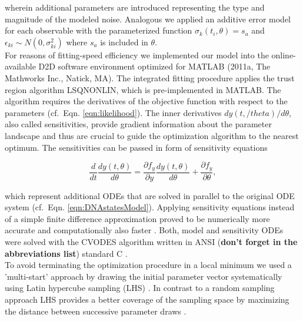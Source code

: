 wherein additional parameters are introduced representing the type and magnitude of the modeled noise. Analogous we applied an additive error model for each observable with the parameterized function $\sigma_{k}(t_i,\theta) = s_a$ and $\epsilon_{ki} \sim N(0,\sigma_{ki}^2)$ where $s_a$ is included in $\theta$.\\ 
For reasons of fitting-speed efficiency we implemented our model into the online-available D2D software environment \cite{Raue2013} optimized for MATLAB (2011a, The Mathworks Inc., Natick, MA). The integrated fitting procedure applies the trust region algorithm LSQNONLIN, which is pre-implemented in MATLAB. The algorithm requires the derivatives of the objective function with respect to the parameters (cf.\ Eqn. \ref{eqn:likelihood}). The inner derivatives $dy(t,/theta)/d\theta$, also called sensitivities, provide gradient information about the parameter landscape and thus are crucial to guide the optimization algorithm to the nearest optimum. The sensitivities can be passed in form of sensitivity equations 

\begin{equation}
	\frac{d}{dt}\frac{dy(t,\theta)}{d\theta} = \frac{\partial f_y}{\partial y}\frac{dy(t,\theta)}{d\theta}+\frac{\partial f_y}{\partial \theta},
\end{equation}  

which represent additional ODEs that are solved in parallel to the original ODE system (cf.\ Eqn. \ref{eqn:DNAstatesModel})\cite{Leis1988}. Applying sensitivity equations instead of a simple finite difference approximation proved to be numerically more accurate and computationally also faster \cite{Raue2013}. Both, model and sensitivity ODEs were solved with the CVODES algorithm written in ANSI (\textbf{don't forget in the abbreviations list}) standard C \cite{Hindmarsh2005}. \\
To avoid terminating the optimization procedure in a local minimum we used a 'multi-start' approach by drawing the initial parameter vector systematically using Latin hypercube sampling (LHS) \cite{Owen2014}. In contrast to a random sampling approach LHS provides a better coverage of the sampling space by maximizing the distance between successive parameter draws \cite{Raue2013}.    

